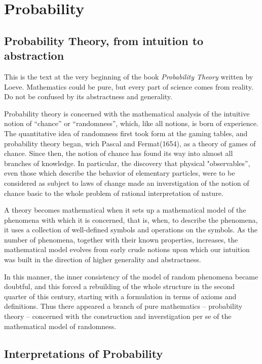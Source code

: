 \documentclass[a4paper]{book}
\begin{document}
\chapter{Probability}


\section{Probability Theory, from intuition to abstraction}

	This is the text at the very beginning of the book \textit{Probability
	Theory} written by Loeve. Mathematics could be pure, but every part of
	science comes from reality. Do not be confused by its abstractness and
	generality.

	Probability theory is concerned with the mathematical analysis of the intuitive
	notion of ``chance'' or ``randomness'', which, like all notions, is born of
	experience. The quantitative idea of randomness first took form at the gaming
	tables, and probability theory began, wich Pascal and Fermat(1654), as a theory
	of games of chance. Since then, the notion of chance has found its way into
	almost all branches of knowledge. In particular, the discovery that physical
	"observables'', even those which describe the behavior of elementary particles,
	were to be considered as subject to laws of change made an inverstigation of
	the notion of chance basic to the whole problem of rational interpretation of
	nature.\cite{1977probability}

	A theory becomes mathematical when it sets up a mathematical model of the
	phenomena with which it is concerned, that is, when, to describe the phenomena,
	it uses a collection of well-defined symbols and operations on the symbols. As
	the number of phenomena, together with their known properties, increases, the
	mathematical model evolves from early crude notions upon which our intuition
	was built in the direction of higher generality and
	abstractness.\cite{1977probability}

	In this manner, the inner consistency of the model of random phenomena became
	doubtful, and this forced a rebuilding of the whole structure in the second
	quarter of this century, starting with a formulation in terms of axioms and
	definitions. Thus there appeared a branch of pure mathematics -- probability
	theory -- concerned with the construction and inverstigation per se of the
	mathematical model of randomness.\cite{1977probability}

\section{Interpretations of Probability}
\end{document}
